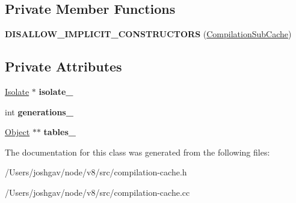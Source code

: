 \subsection*{Private Member Functions}
\begin{DoxyCompactItemize}
\item 
{\bfseries D\+I\+S\+A\+L\+L\+O\+W\+\_\+\+I\+M\+P\+L\+I\+C\+I\+T\+\_\+\+C\+O\+N\+S\+T\+R\+U\+C\+T\+O\+RS} (\hyperlink{classv8_1_1internal_1_1_compilation_sub_cache}{Compilation\+Sub\+Cache})\hypertarget{classv8_1_1internal_1_1_compilation_sub_cache_a6e2fcc573cc1e86bf23005fb9b88fddf}{}\label{classv8_1_1internal_1_1_compilation_sub_cache_a6e2fcc573cc1e86bf23005fb9b88fddf}

\end{DoxyCompactItemize}
\subsection*{Private Attributes}
\begin{DoxyCompactItemize}
\item 
\hyperlink{classv8_1_1internal_1_1_isolate}{Isolate} $\ast$ {\bfseries isolate\+\_\+}\hypertarget{classv8_1_1internal_1_1_compilation_sub_cache_acdd8abd04c2c7b7c742ba07178661c15}{}\label{classv8_1_1internal_1_1_compilation_sub_cache_acdd8abd04c2c7b7c742ba07178661c15}

\item 
int {\bfseries generations\+\_\+}\hypertarget{classv8_1_1internal_1_1_compilation_sub_cache_af3d6be1fcdb85d2aee266e6add9d84e1}{}\label{classv8_1_1internal_1_1_compilation_sub_cache_af3d6be1fcdb85d2aee266e6add9d84e1}

\item 
\hyperlink{classv8_1_1internal_1_1_object}{Object} $\ast$$\ast$ {\bfseries tables\+\_\+}\hypertarget{classv8_1_1internal_1_1_compilation_sub_cache_a5280f3542ba516a962cbcc44616304eb}{}\label{classv8_1_1internal_1_1_compilation_sub_cache_a5280f3542ba516a962cbcc44616304eb}

\end{DoxyCompactItemize}


The documentation for this class was generated from the following files\+:\begin{DoxyCompactItemize}
\item 
/\+Users/joshgav/node/v8/src/compilation-\/cache.\+h\item 
/\+Users/joshgav/node/v8/src/compilation-\/cache.\+cc\end{DoxyCompactItemize}
